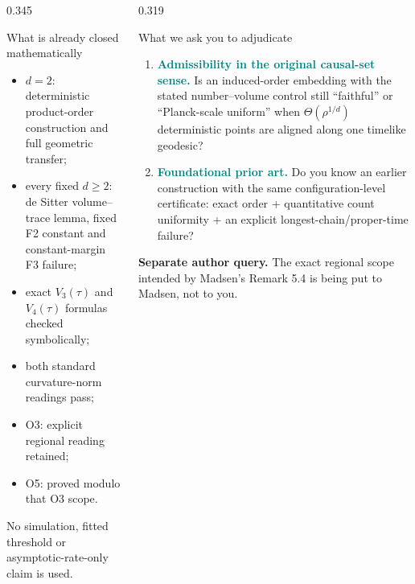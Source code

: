 \documentclass[final]{beamer}
\newcommand{\key}[1]{\textcolor{Teal}{\bfseries #1}}
\begin{document}
\begin{frame}[t]
\begin{columns}[T,totalwidth=\textwidth]
\begin{column}{0.345\textwidth}
\begin{posterbox}{What is already closed mathematically}
  \begin{itemize}
    \setlength\itemsep{2.5mm}
    \item \(d=2\): deterministic product-order construction and full geometric transfer;
    \item every fixed \(d\ge2\): de Sitter volume--trace lemma, fixed F2 constant and
          constant-margin F3 failure;
    \item exact \(V_3(\tau)\) and \(V_4(\tau)\) formulas checked symbolically;
    \item both standard curvature-norm readings pass;
    \item O3: explicit regional reading retained;
    \item O5: proved modulo that O3 scope.
  \end{itemize}
  No simulation, fitted threshold or asymptotic-rate-only claim is used.
\end{posterbox}

\end{column}

\hfill

\begin{column}{0.319\textwidth}

\begin{posterbox}{What we ask you to adjudicate}
  \begin{enumerate}
    \setlength\itemsep{7mm}
    \item \key{Admissibility in the original causal-set sense.}
      Is an induced-order embedding with the stated number--volume control still “faithful” or
      “Planck-scale uniform” when \(\Theta(\rho^{1/d})\) deterministic points are aligned along one
      timelike geodesic?

    \item \key{Foundational prior art.}
      Do you know an earlier construction with the same configuration-level certificate:
      exact order + quantitative count uniformity + an explicit longest-chain/proper-time failure?
  \end{enumerate}

  \vspace{5mm}
  {\color{Muted}\textbf{Separate author query.} The exact regional scope intended by Madsen's
  Remark 5.4 is being put to Madsen, not to you.}
\end{posterbox}


\end{column}
\end{columns}
\end{frame}
\end{document}
